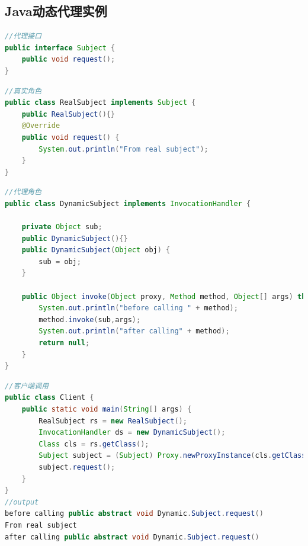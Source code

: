 \subsection{Java动态代理实例}
\begin{lstlisting}[language=java]
//代理接口
public interface Subject {
	public void request();
}
\end{lstlisting}
\begin{lstlisting}[language=java]
//真实角色
public class RealSubject implements Subject {
	public RealSubject(){}
	@Override
	public void request() {
		System.out.println("From real subject");
	}
}
\end{lstlisting}
\begin{lstlisting}[language=java]
//代理角色
public class DynamicSubject implements InvocationHandler {

	private Object sub;
	public DynamicSubject(){}
	public DynamicSubject(Object obj) {
		sub = obj;
	}

	public Object invoke(Object proxy, Method method, Object[] args) throws Throwable {
		System.out.println("before calling " + method);
		method.invoke(sub,args);
		System.out.println("after calling" + method);
		return null;
	}
}
\end{lstlisting}
\begin{lstlisting}[language=java]
//客户端调用
public class Client {
	public static void main(String[] args) {
		RealSubject rs = new RealSubject();
		InvocationHandler ds = new DynamicSubject();
		Class cls = rs.getClass();
		Subject subject = (Subject) Proxy.newProxyInstance(cls.getClassLoader(),cls.getInterfaces(),ds);
		subject.request();
	}
}
//output
before calling public abstract void Dynamic.Subject.request()
From real subject
after calling public abstract void Dynamic.Subject.request()
\end{lstlisting}
